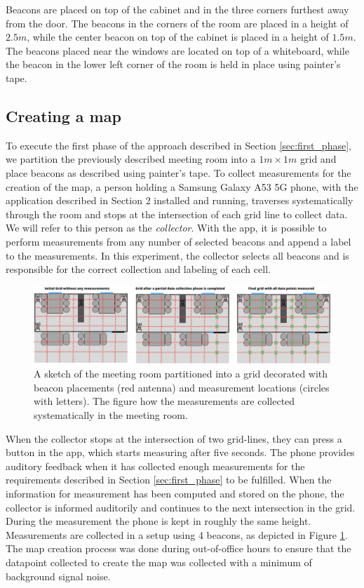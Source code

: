 Beacons are placed on top of the cabinet and in the three corners furthest away from the door. 
The beacons in the corners of the room are placed in a height of $2.5m$, while the center beacon on top of the cabinet is placed in a height of $1.5m$.   
The beacons placed near the windows are located on top of a whiteboard, while the beacon in the lower left corner of the room is held in place using painter's tape. 

\subsection{Creating a map}
To execute the first phase of the approach described in Section \ref{sec:first_phase},  we partition the previously described meeting room into a $1m \times 1m$ grid and place beacons as described using painter's tape.%
To collect measurements for the creation of the map, a person holding a Samsung Galaxy A53 5G phone, with the application described in Section 2 installed and running, traverses systematically through the room and stops at the intersection of each grid line to collect data. 
We will refer to this person as the \textit{collector}.
With the app, it is possible to perform measurements from any number of selected beacons and append a label to the measurements.
In this experiment, the collector selects all beacons and is responsible for the correct collection and labeling of each cell.
\begin{figure}[h]
    \centering
    \includegraphics[width=\textwidth]{images/experiment_map_creation.png}
    \caption{A sketch of the meeting room partitioned into a grid decorated with beacon placements (red antenna) and measurement locations (circles with letters). The figure how the measurements are collected systematically in the meeting room.}
    \label{fig:experiment_map_creation}
\end{figure}
When the collector stops at the intersection of two grid-lines, they can press a button in the app, which starts measuring after five seconds.
The phone provides auditory feedback when it has collected enough measurements for the requirements described in Section \ref{sec:first_phase} to be fulfilled.
When the information for measurement has been computed and stored on the phone, the collector is informed auditorily and continues to the next intersection in the grid. 
During the measurement the phone is kept in roughly the same height.
Measurements are collected in a setup using 4 beacons, as depicted in Figure \ref{fig:experiment_map_creation}.
The map creation process was done during out-of-office hours to ensure that the datapoint collected to create the map was collected with a minimum of background signal noise.  

